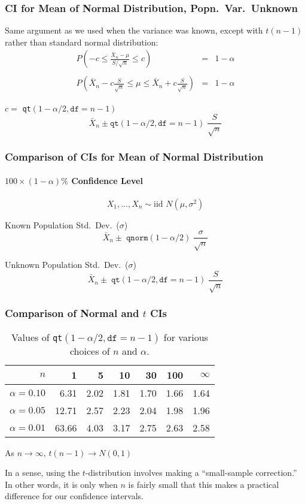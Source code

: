 
\begin{frame}
\frametitle{CI for Mean of Normal Distribution, Popn.\ Var.\ Unknown}
Same argument as we used when the variance was known, except with $t(n-1)$ rather than standard normal distribution:
	\begin{eqnarray*}
		P\left(-c \leq \frac{\bar{X}_n-\mu}{S/\sqrt{n}} \leq c \right) &=& 1-\alpha \\ \\ 
		P\left(\bar{X}_n - c \frac{S}{\sqrt{n}} \leq \mu\leq \bar{X}_n +c \frac{S}{\sqrt{n}} \right) &=& 1-\alpha 
	\end{eqnarray*}

\alert{$c =$ \texttt{qt}$(1-\alpha/2, \texttt{df} = n-1)$} 
	$$\boxed{\bar{X}_n \pm \texttt{qt}(1-\alpha/2, \texttt{df} = n-1)\;  \frac{S}{\sqrt{n}}}$$
\end{frame}



\begin{frame}
\frametitle{Comparison of CIs for Mean of Normal Distribution}
\framesubtitle{$100\times(1-\alpha)\%$ Confidence Level}
$$\boxed{X_1, \hdots, X_n \sim \mbox{iid } N(\mu, \sigma^2)}$$


\begin{block}{Known Population Std.\ Dev.\ ($\sigma$)}
	$$\bar{X}_n \pm \; \texttt{qnorm}(1-\alpha/2) \; \frac{\sigma}{\sqrt{n}}$$
\end{block}


\begin{block}{Unknown Population Std.\ Dev.\ ($\sigma$)}
$$\bar{X}_n \pm \; \texttt{qt}(1-\alpha/2, \texttt{df} = n-1) \; \frac{S}{\sqrt{n}}$$
\end{block}
\end{frame}
\begin{frame}
\frametitle{Comparison of Normal and $t$ CIs}
\begin{table}
\caption{Values of \texttt{qt}$(1-\alpha/2, \texttt{df}=n-1)$ for various choices of $n$ and $\alpha$. }
\begin{tabular}{r|rrrrr|r}
\hline
$n$& 1& 5& 10& 30& 100 & $\infty$\\
\hline
$\alpha = 0.10$&  6.31& 2.02 & 1.81 & 1.70  & 1.66 &1.64\\
$\alpha = 0.05$ & 12.71& 2.57 & 2.23 & 2.04  & 1.98 &1.96\\
$\alpha = 0.01$ & 63.66& 4.03 & 3.17 & 2.75  & 2.63 &2.58\\
\hline
\end{tabular}
\end{table}
\alert{As $n\rightarrow \infty$, $t(n-1) \rightarrow N(0,1)$}
\vspace{1em}


In a sense, using the $t$-distribution involves making a ``small-sample correction.'' In other words, it is only when $n$ is fairly small that this makes a practical difference for our confidence intervals.
\end{frame}


